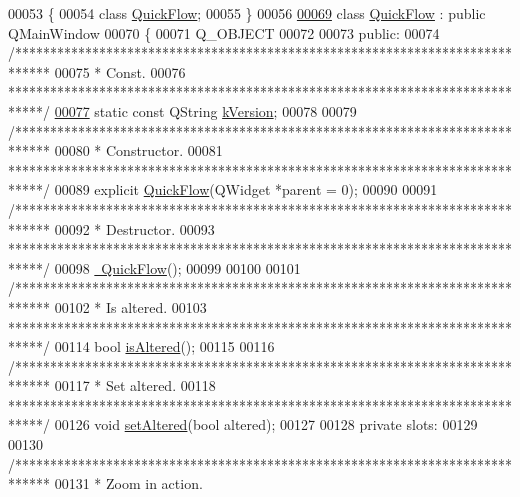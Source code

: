 \begin{DoxyCode}
00053 \{
00054 \textcolor{keyword}{class }\hyperlink{class_quick_flow}{QuickFlow};
00055 \}
00056 
\hypertarget{quickflow_8h_source_l00069}{}\hyperlink{class_quick_flow}{00069} \textcolor{keyword}{class }\hyperlink{class_quick_flow}{QuickFlow} : \textcolor{keyword}{public} QMainWindow
00070 \{
00071   Q\_OBJECT
00072 
00073 \textcolor{keyword}{public}:
00074   \textcolor{comment}{/*****************************************************************************}
00075 \textcolor{comment}{  * Const.}
00076 \textcolor{comment}{  *****************************************************************************/}
\hypertarget{quickflow_8h_source_l00077}{}\hyperlink{group___window_gabfc3b1280bdae9a9c046d56b1459ab99}{00077}   \textcolor{keyword}{static} \textcolor{keyword}{const} QString \hyperlink{group___window_gabfc3b1280bdae9a9c046d56b1459ab99}{kVersion};
00078 
00079   \textcolor{comment}{/*****************************************************************************}
00080 \textcolor{comment}{  * Constructor.}
00081 \textcolor{comment}{  *****************************************************************************/}
00089   \textcolor{keyword}{explicit} \hyperlink{group___window_ga7689e2608835392fce3f4c95a7a542db}{QuickFlow}(QWidget *parent = 0);
00090 
00091   \textcolor{comment}{/*****************************************************************************}
00092 \textcolor{comment}{  * Destructor.}
00093 \textcolor{comment}{  *****************************************************************************/}
00098   \hyperlink{group___window_ga985823a0db64246b3a15eed2f397e0a4}{~QuickFlow}();
00099 
00100 
00101   \textcolor{comment}{/*****************************************************************************}
00102 \textcolor{comment}{  * Is altered.}
00103 \textcolor{comment}{  *****************************************************************************/}
00114   \textcolor{keywordtype}{bool} \hyperlink{group___window_ga5d9148467ef65c48419bf020ee107a45}{isAltered}();
00115 
00116   \textcolor{comment}{/*****************************************************************************}
00117 \textcolor{comment}{  * Set altered.}
00118 \textcolor{comment}{  *****************************************************************************/}
00126   \textcolor{keywordtype}{void} \hyperlink{group___window_ga4b63ea5ca52a9eea14db0a22b5a133f8}{setAltered}(\textcolor{keywordtype}{bool} altered);
00127 
00128 \textcolor{keyword}{private} slots:
00129 
00130   \textcolor{comment}{/*****************************************************************************}
00131 \textcolor{comment}{  * Zoom in action.}

\end{DoxyCode}
